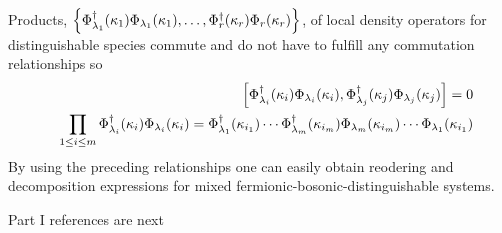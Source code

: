 Products, $\left\{ \Phi _{{\cal \lambda }_{1}}^{\dagger }(\kappa _{1})\Phi _{%
{\cal \lambda }_{1}}(\kappa _{1}),\ldots ,\Phi _{r}^{\dagger }(\kappa
_{r})\Phi _{r}(\kappa _{r})\right\} $, of local density operators for
distinguishable species commute and do not have to fulfill any commutation
relationships so 
\begin{eqnarray}
&&\left[ \Phi _{{\cal \lambda }_{i}}^{\dagger }(\kappa _{i})\Phi _{{\cal %
\lambda }_{i}}(\kappa _{i}),\Phi _{{\cal \lambda }_{j}}^{\dagger }(\kappa
_{j})\Phi _{{\cal \lambda }_{j}}(\kappa _{j})\right] =0  \nonumber \\
&&\prod_{1\leq i\leq m}\Phi _{{\cal \lambda }_{i}}^{\dagger }(\kappa
_{i})\Phi _{{\cal \lambda }_{i}}(\kappa _{i})=\Phi _{{\cal \lambda }%
_{1}}^{\dagger }(\kappa _{i_{1}})\cdots \Phi _{{\cal \lambda }_{m}}^{\dagger
}(\kappa _{i_{m}})\Phi _{{\cal \lambda }_{m}}(\kappa _{i_{m}})\cdots \Phi _{%
{\cal \lambda }_{1}}(\kappa _{i_{1}})
\end{eqnarray}%
By using the preceding relationships one can easily obtain reodering and
decomposition expressions for mixed fermionic-bosonic-distinguishable
systems.

{\sc Part I references are next}

